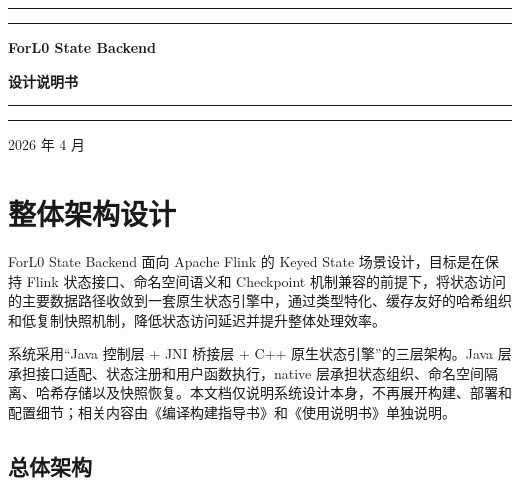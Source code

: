 \documentclass[a4paper,11pt]{article}
\newcommand{\project}{ForL0 State Backend}
\newcommand{\coverrule}{{\color{accent}\rule{\linewidth}{0.9pt}}}
\newcommand{\coverrulethin}{{\color{accent!55}\rule{\linewidth}{0.3pt}}}
\begin{document}
\begin{titlepage}
\thispagestyle{empty}
\centering
\vspace*{5.5cm}

\coverrule
\vspace{2pt}
\coverrulethin

\vspace{1.6cm}
{\sffamily\huge\bfseries\color{accent} \project\par}
\vspace{0.8cm}
{\sffamily\LARGE\bfseries 设计说明书\par}

\vspace{1.6cm}
\coverrulethin
\vspace{2pt}
\coverrule

\vfill

{\sffamily\large\color{accent!85} 2026 年 4 月\par}

\vspace{1.2cm}
\end{titlepage}

\pagestyle{plain}
\tableofcontents
\clearpage
{}
\setcounter{page}{1}
\pagestyle{fancy}

\section{整体架构设计}

\project{} 面向 Apache Flink 的 Keyed State 场景设计，目标是在保持 Flink 状态接口、命名空间语义和 Checkpoint 机制兼容的前提下，将状态访问的主要数据路径收敛到一套原生状态引擎中，通过类型特化、缓存友好的哈希组织和低复制快照机制，降低状态访问延迟并提升整体处理效率。

系统采用“Java 控制层 + JNI 桥接层 + C++ 原生状态引擎”的三层架构。Java 层承担接口适配、状态注册和用户函数执行，native 层承担状态组织、命名空间隔离、哈希存储以及快照恢复。本文档仅说明系统设计本身，不再展开构建、部署和配置细节；相关内容由《编译构建指导书》和《使用说明书》单独说明。

\subsection{总体架构}
\end{document}
